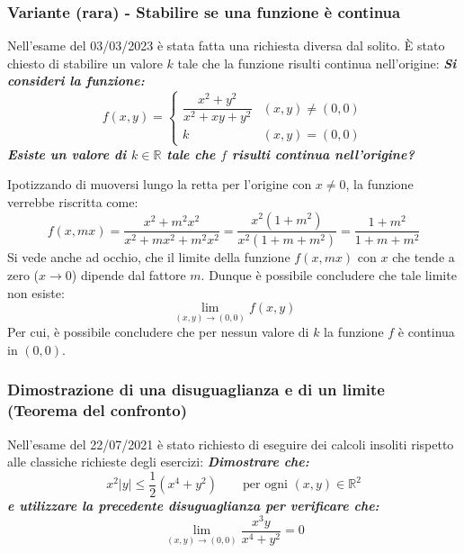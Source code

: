 \documentclass[a4paper]{article}
\begin{document}
	\subsubsection{Variante (rara) - Stabilire se una funzione è continua}

	Nell'esame del 03/03/2023 è stata fatta una richiesta diversa dal solito. È stato chiesto di stabilire un valore $k$ tale che la funzione risulti continua nell'origine: \textcolor{Green4}{\textbf{\emph{Si consideri la funzione:}}
	\begin{equation*}
		f\left(x,y\right) = \begin{cases}
			\dfrac{x^{2} + y^{2}}{x^{2} + xy + y^{2}}	& \left(x,y\right) \ne \left(0,0\right) \\
			k	& \left(x,y\right) = \left(0,0\right)
		\end{cases}
	\end{equation*}
	\textbf{\emph{Esiste un valore di $k \in \mathbb{R}$ tale che $f$ risulti continua nell'origine?}}}\newline

	\noindent
	Ipotizzando di muoversi lungo la retta per l'origine con $x \ne 0$, la funzione verrebbe riscritta come:
	\begin{equation*}
		f\left(x,mx\right) = \dfrac{x^{2} + m^{2}x^{2}}{x^{2} + mx^{2} + m^{2}x^{2}} = \dfrac{x^{2}\left(1+m^{2}\right)}{x^{2}\left(1 + m + m^{2}\right)} = \dfrac{1 + m^{2}}{1 + m + m^{2}}
	\end{equation*}
	Si vede anche ad occhio, che il limite della funzione $f\left(x,mx\right)$ con $x$ che tende a zero ($x \rightarrow 0$) dipende dal fattore $m$. Dunque è possibile concludere che tale limite non esiste:
	\begin{equation*}
		\displaystyle\lim_{\left(x,y\right) \rightarrow \left(0,0\right)} f\left(x,y\right)
	\end{equation*}
	Per cui, è possibile concludere che per nessun valore di $k$ la funzione $f$ è continua in $\left(0,0\right)$.\newpage

	\subsubsection{Dimostrazione di una disuguaglianza e di un limite (Teorema del confronto)}

	Nell'esame del 22/07/2021 è stato richiesto di eseguire dei calcoli insoliti rispetto alle classiche richieste degli esercizi: \textcolor{Green4}{\textbf{\emph{Dimostrare che:}}
	\begin{equation*}
		x^{2} |y| \le \dfrac{1}{2}\left(x^{4} + y^{2}\right) \hspace{2em} \text{per ogni } \left(x,y\right) \in \mathbb{R}^{2}
	\end{equation*}
	\textbf{\emph{e utilizzare la precedente disuguaglianza per verificare che:}}
	\begin{equation*}
		\displaystyle\lim_{\left(x,y\right) \rightarrow \left(0,0\right)} \dfrac{x^{3} y}{x^{4} + y^{2}} = 0
	\end{equation*}}\:\newline
\end{document}
